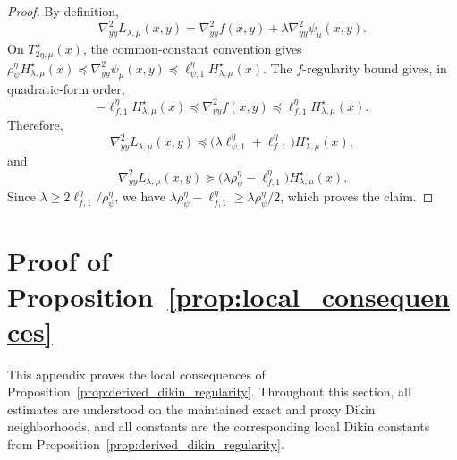 \documentclass{article}
\begin{document}
\begin{proof}
By definition,
\begin{equation*}
\nabla_{yy}^2L_{\lambda,\mu}(x,y)
=
\nabla_{yy}^2 f(x,y)
+
\lambda\nabla_{yy}^2\psi_\mu(x,y).
\end{equation*}
On \(T_{2\eta,\mu}^{\lambda}(x)\), the common-constant convention gives
\(\rho_\psi^\eta H_{\lambda,\mu}^\star(x)\preceq
\nabla_{yy}^2\psi_\mu(x,y)\preceq
\ell_{\psi,1}^\eta H_{\lambda,\mu}^\star(x)\). The \(f\)-regularity bound gives, in quadratic-form
order,
\begin{equation*}
-\ell_{f,1}^\eta H_{\lambda,\mu}^\star(x)
\preceq
\nabla_{yy}^2 f(x,y)
\preceq
\ell_{f,1}^\eta H_{\lambda,\mu}^\star(x).
\end{equation*}
Therefore,
\begin{equation*}
\nabla_{yy}^2L_{\lambda,\mu}(x,y)
\preceq
\bigl(\lambda\ell_{\psi,1}^\eta+\ell_{f,1}^\eta\bigr)
H_{\lambda,\mu}^\star(x),
\end{equation*}
and
\begin{equation*}
\nabla_{yy}^2L_{\lambda,\mu}(x,y)
\succeq
\bigl(\lambda\rho_\psi^\eta-\ell_{f,1}^\eta\bigr)
H_{\lambda,\mu}^\star(x).
\end{equation*}
Since \(\lambda\ge 2\ell_{f,1}^\eta/\rho_\psi^\eta\), we have
\(\lambda\rho_\psi^\eta-\ell_{f,1}^\eta\ge \lambda\rho_\psi^\eta/2\), which proves the claim.
\end{proof}

\section{Proof of Proposition~\ref{prop:local_consequences}}
\label{app:local_consequences}

This appendix proves the local consequences of Proposition~\ref{prop:derived_dikin_regularity}.
Throughout this section, all estimates are understood on the maintained exact and proxy Dikin neighborhoods,
and all constants are the corresponding local Dikin constants from Proposition~\ref{prop:derived_dikin_regularity}.
\end{document}
